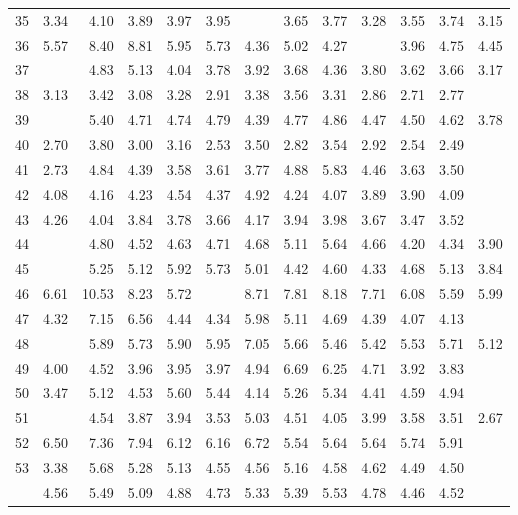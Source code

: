 \begin{tabular}{rrrrrrrrrrrrr}
  35 & 3.34 & 4.10 & 3.89 & 3.97 & 3.95 & \color{blue}{3.10} & 3.65 & 3.77 & 3.28 & 3.55 & 3.74 & 3.15 \\ 
  36 & 5.57 & 8.40 & 8.81 & 5.95 & 5.73 & 4.36 & 5.02 & 4.27 & \color{blue}{3.57} & 3.96 & 4.75 & 4.45 \\ 
  37 & \color{blue}{3.02} & 4.83 & 5.13 & 4.04 & 3.78 & 3.92 & 3.68 & 4.36 & 3.80 & 3.62 & 3.66 & 3.17 \\ 
  38 & 3.13 & 3.42 & 3.08 & 3.28 & 2.91 & 3.38 & 3.56 & 3.31 & 2.86 & 2.71 & 2.77 & \color{blue}{2.68} \\ 
  39 & \color{blue}{3.47} & 5.40 & 4.71 & 4.74 & 4.79 & 4.39 & 4.77 & 4.86 & 4.47 & 4.50 & 4.62 & 3.78 \\ 
  40 & 2.70 & 3.80 & 3.00 & 3.16 & 2.53 & 3.50 & 2.82 & 3.54 & 2.92 & 2.54 & 2.49 & \color{blue}{2.43} \\ 
  41 & 2.73 & 4.84 & 4.39 & 3.58 & 3.61 & 3.77 & 4.88 & 5.83 & 4.46 & 3.63 & 3.50 & \color{blue}{2.60} \\ 
  42 & 4.08 & 4.16 & 4.23 & 4.54 & 4.37 & 4.92 & 4.24 & 4.07 & 3.89 & 3.90 & 4.09 & \color{blue}{3.71} \\ 
  43 & 4.26 & 4.04 & 3.84 & 3.78 & 3.66 & 4.17 & 3.94 & 3.98 & 3.67 & 3.47 & 3.52 & \color{blue}{3.30} \\ 
  44 & \color{blue}{3.88} & 4.80 & 4.52 & 4.63 & 4.71 & 4.68 & 5.11 & 5.64 & 4.66 & 4.20 & 4.34 & 3.90 \\ 
  45 & \color{blue}{3.62} & 5.25 & 5.12 & 5.92 & 5.73 & 5.01 & 4.42 & 4.60 & 4.33 & 4.68 & 5.13 & 3.84 \\ 
  46 & 6.61 & 10.53 & 8.23 & 5.72 & \color{blue}{5.41} & 8.71 & 7.81 & 8.18 & 7.71 & 6.08 & 5.59 & 5.99 \\ 
  47 & 4.32 & 7.15 & 6.56 & 4.44 & 4.34 & 5.98 & 5.11 & 4.69 & 4.39 & 4.07 & 4.13 & \color{blue}{3.98} \\ 
  48 & \color{blue}{5.07} & 5.89 & 5.73 & 5.90 & 5.95 & 7.05 & 5.66 & 5.46 & 5.42 & 5.53 & 5.71 & 5.12 \\ 
  49 & 4.00 & 4.52 & 3.96 & 3.95 & 3.97 & 4.94 & 6.69 & 6.25 & 4.71 & 3.92 & 3.83 & \color{blue}{3.70} \\ 
  50 & 3.47 & 5.12 & 4.53 & 5.60 & 5.44 & 4.14 & 5.26 & 5.34 & 4.41 & 4.59 & 4.94 & \color{blue}{3.16} \\ 
  51 & \color{blue}{2.62} & 4.54 & 3.87 & 3.94 & 3.53 & 5.03 & 4.51 & 4.05 & 3.99 & 3.58 & 3.51 & 2.67 \\ 
  52 & 6.50 & 7.36 & 7.94 & 6.12 & 6.16 & 6.72 & 5.54 & 5.64 & 5.64 & 5.74 & 5.91 & \color{blue}{5.15} \\ 
  53 & 3.38 & 5.68 & 5.28 & 5.13 & 4.55 & 4.56 & 5.16 & 4.58 & 4.62 & 4.49 & 4.50 & \color{blue}{3.09} \\ 
   \hline
 & 4.56 & 5.49 & 5.09 & 4.88 & 4.73 & 5.33 & 5.39 & 5.53 & 4.78 & 4.46 & 4.52 & \color{blue}{4.15} \\ 
   \hline
\end{tabular}

